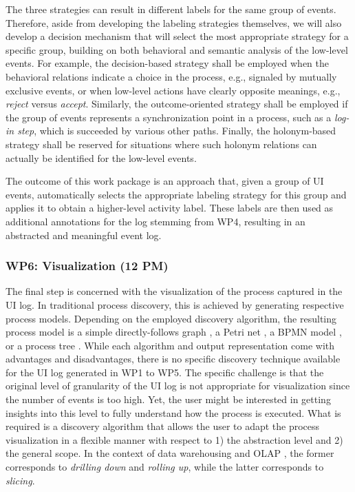  The three strategies can result in different labels for the same group of events. Therefore, aside from developing the labeling strategies themselves, we will also develop a decision mechanism that will select the most appropriate strategy for a specific group, building on both behavioral and semantic analysis of the low-level events. For example, the decision-based strategy shall be employed when the behavioral relations indicate a choice in the process, e.g., signaled by mutually exclusive events, or when low-level actions have clearly opposite meanings, e.g., \emph{reject} versus \emph{accept}. Similarly, the outcome-oriented strategy shall be employed if the group of events represents a synchronization point in a process, such as a \emph{log-in step}, which is succeeded by various other paths. Finally, the holonym-based strategy shall be reserved for situations where such holonym relations can actually be identified for the low-level events. 

 The outcome of this work package is an approach that, given a group of UI events, automatically selects the appropriate labeling strategy for this group and applies it to obtain a higher-level activity label. These labels are then used as additional annotations for the log stemming from WP4, resulting in an abstracted and meaningful event log. 


\subsubsection{WP6: Visualization (12 PM)}
\label{sec:wp6}

The final step is concerned with the visualization of the process captured in the UI log. In traditional process discovery, this is achieved by generating respective process models. Depending on the employed discovery algorithm, the resulting process model is a simple directly-follows graph \cite{van2019practitioner}, a Petri net \cite{van2004workflow}, a BPMN model \cite{conforti2016bpmn}, or a process tree \cite{leemans2013discovering}. While each algorithm and output representation come with advantages and disadvantages, there is no specific discovery technique available for the UI log generated in WP1 to WP5. The specific challenge is that the original level of granularity of the UI log is not appropriate for visualization since the number of events is too high. Yet, the user might be interested in getting insights into this level to fully understand how the process is executed. What is required is a discovery algorithm that allows the user to adapt the process visualization in a flexible manner with respect to 1) the abstraction level and 2) the general scope. In the context of data warehousing and OLAP \cite{chaudhuri1997overview}, the former corresponds to \textit{drilling down} and \textit{rolling up}, while the latter corresponds to \textit{slicing}. 

